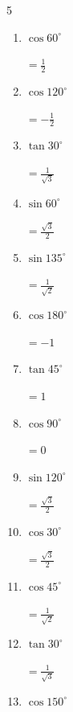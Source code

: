 \begin{multicols}{5}
\begin{enumerate}
        $\displaystyle =\frac{\sqrt{3}}{2}$

  \item $\displaystyle \cos{60^\circ}$

        $\displaystyle =\frac{1}{2}$

  \item $\displaystyle \cos{120^\circ}$

        $\displaystyle =-\frac{1}{2}$

  \item $\displaystyle \tan{30^\circ}$

        $\displaystyle =\frac{1}{\sqrt{3}}$

  \item $\displaystyle \sin{60^\circ}$

        $\displaystyle =\frac{\sqrt{3}}{2}$

  \item $\displaystyle \sin{135^\circ}$

        $\displaystyle =\frac{1}{\sqrt{2}}$

  \item $\displaystyle \cos{180^\circ}$

        $\displaystyle =-1$

  \item $\displaystyle \tan{45^\circ}$

        $\displaystyle =1$

  \item $\displaystyle \cos{90^\circ}$

        $\displaystyle =0$

  \item $\displaystyle \sin{120^\circ}$

        $\displaystyle =\frac{\sqrt{3}}{2}$

  \item $\displaystyle \cos{30^\circ}$

        $\displaystyle =\frac{\sqrt{3}}{2}$

  \item $\displaystyle \cos{45^\circ}$

        $\displaystyle =\frac{1}{\sqrt{2}}$

  \item $\displaystyle \tan{30^\circ}$

        $\displaystyle =\frac{1}{\sqrt{3}}$

\columnbreak %

  \item $\displaystyle \cos{150^\circ}$


\end{enumerate}
\end{multicols}
